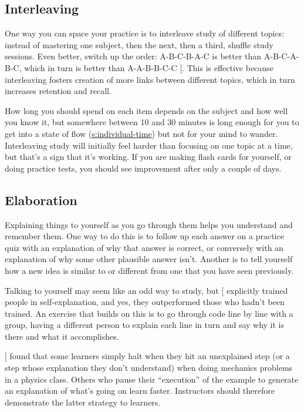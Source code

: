 \subsection{Interleaving}\label{interleaving}

One way you can space your practice is to interleave study of different
topics: instead of mastering one subject, then the next, then a third,
shuffle study sessions. Even better, switch up the order: A-B-C-B-A-C is
better than A-B-C-A-B-C, which in turn is better than A-A-B-B-C-C
{[}\protect[\hyperlink{b:Rohrer2015}{Rohrer2015}]{]}. This is effective because interleaving fosters
creation of more links between different topics, which in turn increases
retention and recall.

How long you should spend on each item depends on the subject and how
well you know it, but somewhere between 10 and 30 minutes is long enough
for you to get into a state of flow (\protect\hyperlink{SECTION}{s:individual-time}) but
not for your mind to wander. Interleaving study will initially feel
harder than focusing on one topic at a time, but that's a sign that it's
working. If you are making flash cards for yourself, or doing practice
tests, you should see improvement after only a couple of days.

\subsection{Elaboration}\label{elaboration}

Explaining things to yourself as you go through them helps you
understand and remember them. One way to do this is to follow up each
answer on a practice quiz with an explanation of why that answer is
correct, or conversely with an explanation of why some other plausible
answer isn't. Another is to tell yourself how a new idea is similar to
or different from one that you have seen previously.

Talking to yourself may seem like an odd way to study, but
{[}\protect[\hyperlink{b:Biel1995}{Biel1995}]{]} explicitly trained people in self-explanation, and
yes, they outperformed those who hadn't been trained. An exercise that
builds on this is to go through code line by line with a group, having a
different person to explain each line in turn and say why it is there
and what it accomplishes.

{[}\protect[\hyperlink{b:Chi1989}{Chi1989}]{]} found that some learners simply halt when they hit an
unexplained step (or a step whose explanation they don't understand)
when doing mechanics problems in a physics class. Others who pause their
``execution'' of the example to generate an explanation of what's going on
learn faster. Instructors should therefore demonstrate the latter
strategy to learners.

